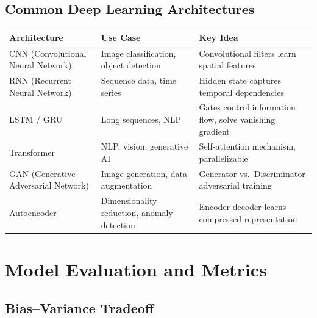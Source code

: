 \documentclass[11pt,a4paper]{article}
\begin{document}
\subsection{Common Deep Learning Architectures}

\begin{longtable}{@{}p{3.5cm}p{4cm}p{5.5cm}@{}}
\toprule
\rowcolor{primary!15}
\textbf{Architecture} & \textbf{Use Case} & \textbf{Key Idea} \\
\midrule
\endhead
CNN (Convolutional Neural Network) & Image classification, object detection & Convolutional filters learn spatial features \\
\addlinespace
RNN (Recurrent Neural Network) & Sequence data, time series & Hidden state captures temporal dependencies \\
\addlinespace
LSTM / GRU & Long sequences, NLP & Gates control information flow, solve vanishing gradient \\
\addlinespace
Transformer & NLP, vision, generative AI & Self-attention mechanism, parallelizable \\
\addlinespace
GAN (Generative Adversarial Network) & Image generation, data augmentation & Generator vs.\ Discriminator adversarial training \\
\addlinespace
Autoencoder & Dimensionality reduction, anomaly detection & Encoder-decoder learns compressed representation \\
\bottomrule
\end{longtable}

\section{Model Evaluation and Metrics}

\subsection{Bias--Variance Tradeoff}
\end{document}
